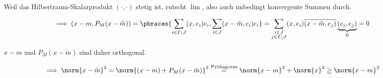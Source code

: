 \begin{solution}
Weil das Hilbertraum-Skalarprodukt $(\cdot, \cdot)$ stetig ist, rutscht $\lim$, also auch unbedingt konvergente Summen durch.

\begin{align*}
    \implies
    (x - m, P_M(x - \tilde m))
    =
    \pbraces
    {
        \sum_{i \in I \setminus J} (x, e_i) e_i,
        \sum_{i \in J} (x - \tilde m, e_i) e_i
    }
    =
    \sum_{\substack{i \in J \\ j \in I \setminus J}}
    (x, e_i)
    \overline{(x - \tilde m, e_j)}
    \underbrace{(e_i, e_j)}_0
    =
    0
\end{align*}

$x - m$ und $P_M(x - \tilde m)$ sind daher orthogonal.

\begin{align*}
    \implies
    \norm{x - \tilde m}^2
    =
    \norm
    {
        (x - m)
        +
        P_M(x - \tilde m)
    }^2
    \stackrel
    {
        \mathrm{Pythagoras}
    }{=}
    \norm{x - m}^2
    +
    \norm{x}^2
    \geq
    \norm{x - m}^2
\end{align*}

\end{solution}

